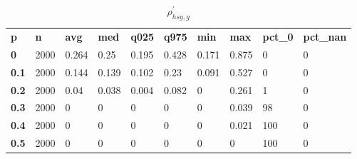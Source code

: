 \begin{table}[h]
 \centering 
\footnotesize
\caption{$\rho_{hsg,g}^\prime $}
\label{tab:alphahsgg}
\begin{tabular}[h]{| l l l l l l l l l l|
    } \hline
\textbf{ p} & \textbf{ n} & \textbf{ avg} & \textbf{ med} & \textbf{ q025} & \textbf{ q975} & \textbf{ min} & \textbf{ max} & \textbf{ pct\_0} & \textbf{ pct\_nan}
           \\
  \textbf{  0} & 2000 & 0.264 &  0.25 & 0.195 & 0.428 & 0.171 & 0.875 &   0 & 0
           \\
  \textbf{0.1} & 2000 & 0.144 & 0.139 & 0.102 &  0.23 & 0.091 & 0.527 &   0 & 0
           \\
  \textbf{0.2} & 2000 &  0.04 & 0.038 & 0.004 & 0.082 &     0 & 0.261 &   1 & 0
           \\
  \textbf{0.3} & 2000 &     0 &     0 &     0 &     0 &     0 & 0.039 &  98 & 0
           \\
  \textbf{0.4} & 2000 &     0 &     0 &     0 &     0 &     0 & 0.021 & 100 & 0
           \\
  \textbf{0.5} & 2000 &     0 &     0 &     0 &     0 &     0 &     0 & 100 & 0
           \\
 \hline \end{tabular}
 \end{table}
